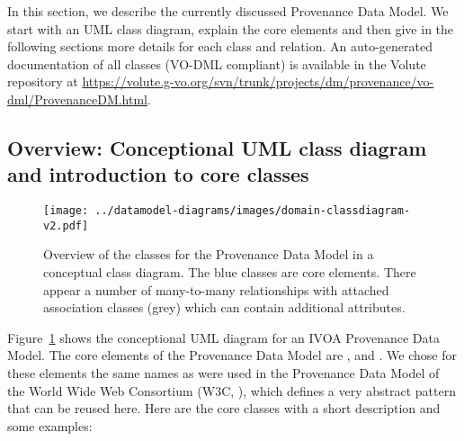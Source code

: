 % 
In this section, we describe the currently discussed Provenance Data Model. We 
start with an UML class diagram, explain the core elements and then give 
in the following sections more details for each class and relation.
An auto-generated documentation of all classes (VO-DML compliant) is available in the Volute repository at \url{https://volute.g-vo.org/svn/trunk/projects/dm/provenance/vo-dml/ProvenanceDM.html}.

\subsection{Overview: Conceptional UML class diagram and introduction to core classes}

\begin{figure}[h]
\centering
\texttt{[image: ../datamodel-diagrams/images/domain-classdiagram-v2.pdf]}
\caption{Overview of the classes for the Provenance Data Model in a conceptual class diagram. The blue classes are core elements. There appear a number of many-to-many relationships with attached association classes (grey) which can contain additional attributes.}
\label{fig:classdiagram-conceptional}
\end{figure}



Figure~\ref{fig:classdiagram-conceptional} shows the conceptional UML diagram for an IVOA Provenance Data
Model.
The core elements of the Provenance Data Model are ,  and . 
We chose for these elements the same names as were used in the Provenance Data 
Model of the World Wide Web Consortium (W3C, \citealt{std:W3CProvDM}), which defines 
a very abstract pattern that can be reused here. Here are the core classes with 
a short description and some examples:

